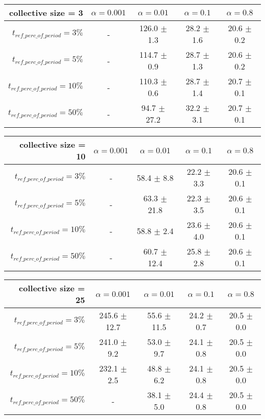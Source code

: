 \begin{table}[t]
	\begin{minipage}{\textwidth}
		\centering
		\begin{tabular}{r | c c c c} \toprule
			collective size = 3
			  & {$\alpha = 0.001$} & {$\alpha = 0.01$} & {$\alpha = 0.1$} & {$\alpha = 0.8$} \\\hline
			{$t_{ref\_perc\_of\_period} = 3\%$} & - & 126.0 $\pm$ 1.3 & 28.2 $\pm$ 1.6 & 20.6 $\pm$ 0.2 \\
			{$t_{ref\_perc\_of\_period} = 5\%$} & - & 114.7 $\pm$ 0.9 & 28.7 $\pm$ 1.3 & 20.6 $\pm$ 0.2 \\
			{$t_{ref\_perc\_of\_period} = 10\%$} & - & 110.3 $\pm$ 0.6 & 28.7 $\pm$ 1.4 & 20.7 $\pm$ 0.1 \\
			{$t_{ref\_perc\_of\_period} = 50\%$} & - & 94.7 $\pm$ 27.2 & 32.2 $\pm$ 3.1 & 20.7 $\pm$ 0.1
		\end{tabular}
	\end{minipage}
	\nl
	
	\begin{minipage}{\textwidth}
		\centering
		\begin{tabular}{r | c c c c} \toprule
			collective size = 10
			  & {$\alpha = 0.001$} & {$\alpha = 0.01$} & {$\alpha = 0.1$} & {$\alpha = 0.8$} \\\hline
			{$t_{ref\_perc\_of\_period} = 3\%$} & - & 58.4 $\pm$ 8.8 & 22.2 $\pm$ 3.3 & 20.6 $\pm$ 0.1 \\
			{$t_{ref\_perc\_of\_period} = 5\%$} & - & 63.3 $\pm$ 21.8 & 22.3 $\pm$ 3.5 & 20.6 $\pm$ 0.1 \\
			{$t_{ref\_perc\_of\_period} = 10\%$} & - & 58.8 $\pm$ 2.4 & 23.6 $\pm$ 4.0 & 20.6 $\pm$ 0.1 \\
			{$t_{ref\_perc\_of\_period} = 50\%$} & - & 60.7 $\pm$ 12.4 & 25.8 $\pm$ 2.8 & 20.6 $\pm$ 0.1
		\end{tabular}
	\end{minipage}
	
	\begin{minipage}{\textwidth}
		\centering
		\begin{tabular}{r | c c c c} \toprule
			collective size = 25
			  & {$\alpha = 0.001$} & {$\alpha = 0.01$} & {$\alpha = 0.1$} & {$\alpha = 0.8$} \\\hline
			{$t_{ref\_perc\_of\_period} = 3\%$} & 245.6 $\pm$ 12.7 & 55.6 $\pm$ 11.5 & 24.2 $\pm$ 0.7 & 20.5 $\pm$ 0.0 \\
			{$t_{ref\_perc\_of\_period} = 5\%$} & 241.0 $\pm$ 9.2 & 53.0 $\pm$ 9.7 & 24.1 $\pm$ 0.8 & 20.5 $\pm$ 0.0 \\
			{$t_{ref\_perc\_of\_period} = 10\%$} & 232.1 $\pm$ 2.5 & 48.8 $\pm$ 6.2 & 24.1 $\pm$ 0.8 & 20.5 $\pm$ 0.0 \\
			{$t_{ref\_perc\_of\_period} = 50\%$} & - & 38.1 $\pm$ 5.0 & 24.4 $\pm$ 0.8 & 20.5 $\pm$ 0.0
		\end{tabular}
	\end{minipage}
	

\end{table}
